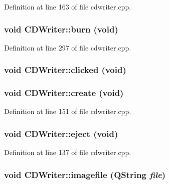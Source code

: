 Definition at line 163 of file cdwriter.cpp.\hypertarget{classCDWriter_844d256e7cccd1de34db4e5fa3690dc6}{
\subsubsection[{burn}]{\setlength{\rightskip}{0pt plus 5cm}void CDWriter::burn (void)}}
\label{classCDWriter_844d256e7cccd1de34db4e5fa3690dc6}




Definition at line 297 of file cdwriter.cpp.\hypertarget{classCDWriter_0191ce407c2ebb99f3140bb44b9a9170}{
\subsubsection[{clicked}]{\setlength{\rightskip}{0pt plus 5cm}void CDWriter::clicked (void)}}
\label{classCDWriter_0191ce407c2ebb99f3140bb44b9a9170}


\hypertarget{classCDWriter_a5dd84acfc0eb5f4a8dc8cb88b305996}{
\subsubsection[{create}]{\setlength{\rightskip}{0pt plus 5cm}void CDWriter::create (void)}}
\label{classCDWriter_a5dd84acfc0eb5f4a8dc8cb88b305996}




Definition at line 151 of file cdwriter.cpp.\hypertarget{classCDWriter_383389be2723db312550f11951efd1a3}{
\subsubsection[{eject}]{\setlength{\rightskip}{0pt plus 5cm}void CDWriter::eject (void)}}
\label{classCDWriter_383389be2723db312550f11951efd1a3}




Definition at line 137 of file cdwriter.cpp.\hypertarget{classCDWriter_f7035db82b553bab5942c320a348728e}{
\subsubsection[{imagefile}]{\setlength{\rightskip}{0pt plus 5cm}void CDWriter::imagefile (QString {\em file})}}
\label{classCDWriter_f7035db82b553bab5942c320a348728e}




